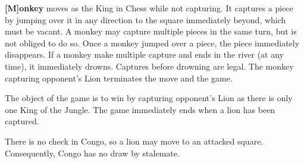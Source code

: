 \vspace{0.5em}

\textbf{[M]onkey}
moves as the King in Chess while not capturing. It captures a piece by jumping
over it in any direction to the square immediately beyond, which must be
vacant. A monkey may capture multiple pieces in the same turn, but is not
obliged to do so. Once a monkey jumped over a piece, the piece immediately
disappears. If a monkey make multiple capture and ends in the river (at any
time), it immediately drowns. Captures before drowning are legal. The monkey
capturing opponent's Lion terminates the move and the game.

\vspace{0.5em}

The object of the game is to win by capturing opponent's Lion as there is only
one King of the Jungle. The game immediately ends when a lion has been
captured.

\vspace{0.5em}

There is no check in Congo, so a lion may move to an attacked square.
Consequently, Congo has no draw by stalemate.
